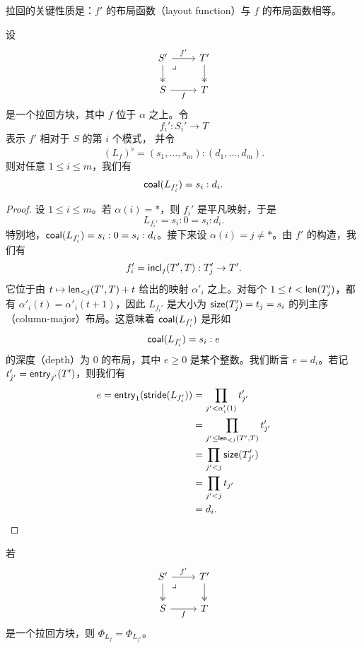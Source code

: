 拉回的关键性质是：$f'$ 的布局函数（layout function）与 $f$ 的布局函数相等。

\begin{lemma}\label{pullbacklemma}
    设
    \[ \begin{tikzcd}
    S' \ar[r,"f'"] \ar[d, two heads] \arrow[dr, phantom, "\lrcorner", very near start] & T' \ar[d,two heads] \\
    S \ar[r,swap,"f"] & T
    \end{tikzcd} \]
    是一个拉回方块，其中 $f$ 位于 $\alpha$ 之上。令
    \[f_i' : S_i' \to T\]
    表示 $f'$ 相对于 $S$ 的第 $i$ 个模式，
    并令
    \[(L_f)^\flat = (s_1,\dots,s_m):(d_1,\dots,d_m).\]
    则对任意 $1 \leq i \leq m$，我们有
    \[
    \mathsf{coal}(L_{f_i'}) = s_i:d_i.
    \]
\end{lemma}
\begin{proof}
    设 $1 \leq i \leq m$。若 $\alpha(i) = *$，则 $f_i'$ 是平凡映射，于是
    \[
    L_{f_i'} = s_i : 0 = s_i : d_i.
    \]
    特别地，$\mathsf{coal}(L_{f_i'}) = s_i:0 = s_i:d_i$。接下来设 $\alpha(i) = j \neq *$。由 $f'$ 的构造，我们有
    \[f_i' = \mathsf{incl}_j(T',T):T_j' \to T'.\]
    它位于由 $t \mapsto \mathsf{len}_{<j}(T',T) + t$ 给出的映射 $\alpha'_i$ 之上。对每个 $1 \leq t < \mathsf{len}(T'_j)$，都有 $\alpha'_i(t) = \alpha'_i(t+1)$，因此 $L_{f_i'}$ 是大小为 $\mathsf{size}(T_j') = t_j = s_i$ 的列主序（column-major）布局。这意味着 $\mathsf{coal}(L_{f_i'})$ 是形如
    \[
    \mathsf{coal}(L_{f_i'}) = s_i : e
    \]
    的深度（depth）为 $0$ 的布局，其中 $e \geq 0$ 是某个整数。我们断言 $e = d_i$。若记 $t_{j'}' = \mathsf{entry}_{j'}(T')$，则我们有
    \begin{align*}
    e = \mathsf{entry}_1(\mathsf{stride}(L_{f_i'})) & = \prod_{j' < \alpha_i'(1)} t_{j'}'\\
    & = \prod_{j' \leq  \mathsf{len}_{<j}(T',T)} t_{j'}'\\
    & = \prod_{j' < j} \mathsf{size}(T_{j'}')\\
    & = \prod_{j' < j} t_{j'}\\
    & = d_i .
    \end{align*}
\end{proof}


\begin{proposition}\label{pullbackproposition}
    若
    \[ \begin{tikzcd}
    S' \ar[r,"f'"] \ar[d, two heads] \arrow[dr, phantom, "\lrcorner", very near start] & T' \ar[d,two heads] \\
    S \ar[r,swap,"f"] & T
    \end{tikzcd} \]
    是一个拉回方块，则 $\Phi_{L_f} = \Phi_{L_{f'}}$。
\end{proposition}

